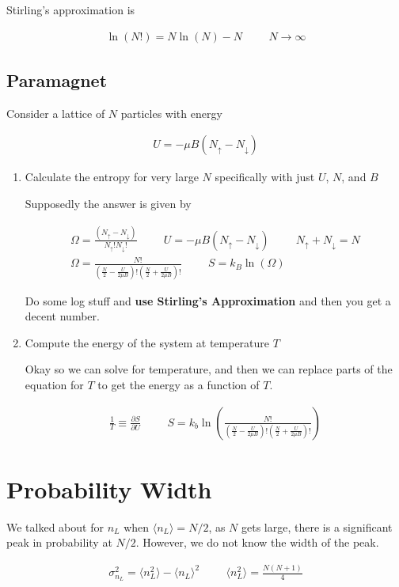 \documentclass[fleqn]{report}
\newcommand{\hp}{\hspace{1cm}}
\newcommand{\del}{\partial}
\newcommand{\equations} [1] {
\begin{gather*}
#1
\end{gather*}
}
\begin{document}
Stirling's approximation is 
\equations{
    \ln(N!)
    =
    N \ln(N) - N
    \hp 
    N \to \infty
}

\subsection{Paramagnet}
Consider a lattice of $N$ particles with energy 

\equations{
    U 
    =
    - \mu B (N_{\uparrow} - N_{\downarrow})
}

\begin{enumerate}[label=\alph*)]
    \item 
    Calculate the entropy for very large $N$ 
    specifically with just $U$, $N$, and $B$

    Supposedly the answer is given by 
    \equations{
        \Omega 
        = 
        \frac{(N_{\uparrow} 
        - 
        N_{\downarrow})}{N_{\uparrow}! N_{\downarrow}!}
        \hp 
        U 
        =
        - \mu B (N_{\uparrow} - N_{\downarrow})
        \hp 
        N_{\uparrow} + N_{\downarrow} = N
        \\
        \Omega 
        =
        \frac{N!}{(\frac{N}{2} - \frac{U}{2 \mu B})!
        (\frac{N}{2} + \frac{U}{2 \mu B})!}
        \hp 
        S 
        =
        k_B \ln(\Omega)
    }

    Do some log stuff and \textbf{use Stirling's Approximation}
    and then you get a decent number.
    \item 
    Compute the energy of the system at temperature $T$

    Okay so we can solve for temperature, and then we 
    can replace parts of the equation for $T$ to get the energy 
    as a function of $T$.

    \equations{
        \frac{1}{T}
        \equiv
        \frac{\del S}{\del U}
        \hp 
        S 
        =
        k_b \ln(
        \frac{N!}{(\frac{N}{2} - \frac{U}{2 \mu B})!
        (\frac{N}{2} + \frac{U}{2 \mu B})!}
        )
    }
\end{enumerate}

\section{Probability Width}
We talked about for $n_L$ when $\langle n_L \rangle = N/2$, as 
$N$ gets large, there is a significant peak in probability at $N/2$. However, 
we do not know the width of the peak. 

\equations{
    \sigma_{n_L}^2 
    =
    \langle n_L^2 \rangle - \langle n_L \rangle^2
    \hp 
    \langle n_L^2 \rangle
    =
    \frac{N (N+1)}{4}
}
\end{document}
